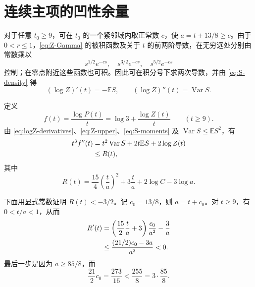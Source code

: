 \documentclass[UTF8,fontset=fandol,11pt]{ctexart}
\newcommand{\E}{\mathbb{E}}
\DeclareMathOperator{\Var}{Var}
\begin{document}
\section{连续主项的凹性余量}

对于任意 $t_0\ge9$，可在 $t_0$ 的一个紧邻域内取正常数 $c$，使 $a=t+13/8\ge c$。由于 $0<r\le1$，\eqref{eq:Z-Gamma} 的被积函数及关于 $t$ 的前两阶导数，在无穷远处分别由常数乘以
\[
s^{1/2}e^{-cs},\quad s^{3/2}e^{-cs},\quad s^{5/2}e^{-cs}
\]
控制；在零点附近这些函数也可积。因此可在积分号下求两次导数，并由 \eqref{eq:S-density} 得
\begin{equation}\label{eq:logZ-derivatives}
(\log Z)'(t)=-\E S,
\qquad
(\log Z)''(t)=\Var S.
\end{equation}

定义
\[
f(t)=\frac{\log P(t)}t
=\log3+\frac{\log Z(t)}t
\qquad(t\ge9).
\]
由 \eqref{eq:logZ-derivatives}、\eqref{eq:Z-upper}、\eqref{eq:S-moments} 及 $\Var S\le\E S^2$，有
\begin{align}
t^3f''(t)
&=t^2\Var S+2t\E S+2\log Z(t)\notag\\
&\le R(t), \label{eq:fpp-R}
\end{align}
其中
\begin{equation}\label{eq:R}
R(t)=\frac{15}{4}\left(\frac ta\right)^2
+3\frac ta+2\log C-3\log a.
\end{equation}

下面用显式常数证明 $R(t)<-3/2$。记 $c_0=13/8$，则 $a=t+c_0$。对 $t\ge9$，有 $0<t/a<1$，从而
\begin{align}
R'(t)
&=\left(\frac{15}{2}\frac ta+3\right)\frac{c_0}{a^2}-\frac3a\notag\\
&\le\frac{(21/2)c_0-3a}{a^2}<0. \label{eq:R-decreasing}
\end{align}
最后一步是因为 $a\ge85/8$，而
\[
\frac{21}{2}c_0=\frac{273}{16}
<\frac{255}{8}=3\cdot\frac{85}{8}.
\]
\end{document}
